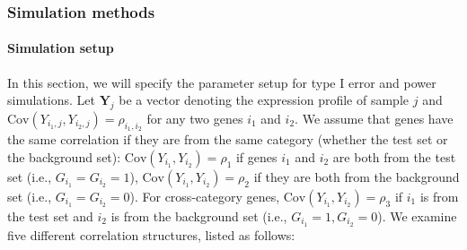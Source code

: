 	
	
	
	\subsubsection{Simulation methods}
	
	\paragraph{Simulation setup}\label{subsection:simulation}
	In this section, we will specify the parameter setup for type I error and power simulations. 
	Let $\bm Y_{j}$ be a vector denoting the expression profile of sample $j$ and 
	$\text{Cov}(Y_{i_1, j}, Y_{i_2, j})=\rho_{i_1,i_2}$ for any two genes $i_1$ and $i_2$. 
	We assume that genes have the same correlation if they are from the same category (whether the 
	test set or the background set): $\text{Cov}(Y_{i_1}, Y_{i_2})= \rho_1$ if
	genes $i_1$ and $i_2$ are both from the test set (i.e., $G_{i_1} = G_{i_2}=1$), 
	$\text{Cov}(Y_{i_1}, Y_{i_2}) =\rho_2$ if they are both from the background set (i.e., $G_{i_1} 
	=
	G_{i_2}=0$). For cross-category genes,  $\text{Cov}(Y_{i_1}, Y_{i_2})= \rho_3$ if $i_1$ is from 
	the test set and 
	$i_2$ is
	from the background set (i.e., $G_{i_1} =1,  G_{i_2}=0$). We examine five different correlation
	structures, listed as follows:
	
